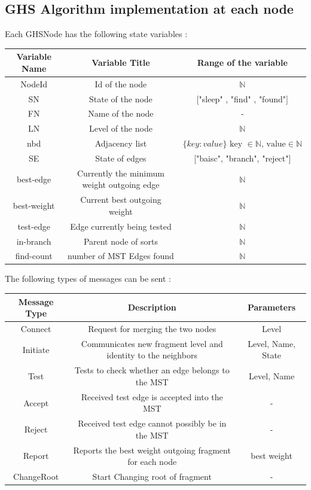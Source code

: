 \documentclass[letterpaper,11pt]{article}
\begin{document}
	\subsection{GHS Algorithm implementation at each node}
	
	Each GHSNode has the following state variables :  \\  
	
	\begin{tabular}{|c|c|c|}
		\hline
		\bf{Variable Name} & \bf{Variable Title} & \bf{Range of the variable} \\
		\hline 
		NodeId & Id of the node &  $\mathbb{N}$ \\
		\hline
		SN & State of the node & ["sleep" , "find" , "found"] \\
		\hline
		FN & Name of the node & - \\
		\hline
		LN & Level of the node & $\mathbb{N}$ \\
		\hline
		nbd & Adjacency list & $\{key : value\} \text{ key } \in \mathbb{N} \text{, } \text{value} \in \mathbb{N} $ \\
		\hline
		SE & State of edges & ["baisc", "branch", "reject"] \\
		\hline 
		best-edge & Currently the minimum weight outgoing edge & $\mathbb{N}$ \\
		\hline
		best-weight & Current best outgoing weight & $\mathbb{N}$ \\
		\hline 
		test-edge & Edge currently being tested & $\mathbb{N}$ \\
		\hline 
		in-branch & Parent node of sorts & $\mathbb{N}$ \\
		\hline 
		find-count & number of MST Edges found & $\mathbb{N}$ \\
		\hline 
	\end{tabular}

	\bigskip 
	
	The following types of messages can be sent : \\
	
	\bigskip
	
	\begin{tabular}{|c|c|c|}
	\hline
	\bf{Message Type} & \bf{Description} & \bf{Parameters} \\
	\hline
	Connect & Request for merging the two nodes & Level \\
	\hline
	Initiate & Communicates new fragment level and identity to the neighbors & Level, Name, State \\
	\hline
 	Test & Tests to check whether an edge belongs to the MST & Level, Name \\
 	\hline
	Accept & Received test edge is accepted into the MST & - \\
	\hline
	Reject & Received test edge cannot possibly be in the MST & - \\
	\hline
	Report & Reports the best weight outgoing fragment for each node & best weight \\ 
	\hline
	ChangeRoot & Start Changing root of fragment  &  - \\
	\hline
	\end{tabular}
\end{document}
